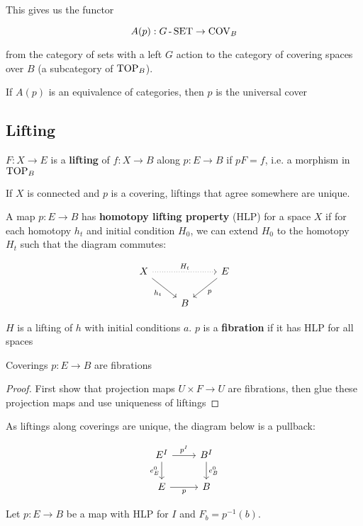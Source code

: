 This gives us the functor

\[A(p):G\operatorname{-}\operatorname{SET}\to\operatorname{COV}_B\]

from the category of sets with a left $G$ action to the category of covering spaces over $B$ (a subcategory of $\operatorname{TOP}_B$).

If $A(p)$ is an equivalence of categories, then $p$ is the universal cover

\subsection{Lifting}

$F:X\to E$ is a \textbf{lifting} of $f:X\to B$ along $p:E\to B$ if $pF=f$, i.e. a morphism in $\operatorname{TOP}_B$

If $X$ is connected and $p$ is a covering, liftings that agree somewhere are unique.

A map $p:E\to B$ has \textbf{homotopy lifting property} (HLP) for a space $X$ if for each homotopy $h_t$ and initial condition $H_0$, we can extend $H_0$ to the homotopy $H_t$ such that the diagram commutes:

\[\begin{tikzcd}
	X && E \\
	& B
	\arrow["{H_t}", dotted, from=1-1, to=1-3]
	\arrow["{h_t}"', from=1-1, to=2-2]
	\arrow["p", from=1-3, to=2-2]
\end{tikzcd}\]

$H$ is a lifting of $h$ with initial conditions $a$. $p$ is a \textbf{fibration} if it has HLP for all spaces

\begin{thm*}
    Coverings $p:E\to B$ are fibrations
\end{thm*}

\begin{proof}
    First show that projection maps $U\times F\to U$ are fibrations, then glue these projection maps and use uniqueness of liftings
\end{proof}

As liftings along coverings are unique, the diagram below is a pullback:

\[\begin{tikzcd} {E^I} & {B^I} \\ E & B
	\arrow["p"', from=2-1, to=2-2]
	\arrow["{p^I}", from=1-1, to=1-2]
	\arrow["{e_B^0}", from=1-2, to=2-2]
	\arrow["{e_E^0}"', from=1-1, to=2-1]
\end{tikzcd}\]

Let $p:E\to B$ be a map with HLP for $I$ and $F_b=p^{-1}(b)$.

